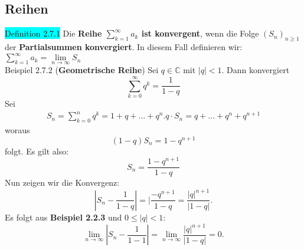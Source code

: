 \documentclass[landscape, 10pt]{article}
\newcommand{\C}{\mathbb{C}}
\begin{document}
\begin{multicols}{3}
       \subsection{Reihen}
              \colorbox{cyan}{Definition 2.7.1} 
                     Die \textbf{Reihe 
                     $\sum_{k=1}^\infty a_k$ ist konvergent}, 
                     wenn die Folge 
                     \textcolor{NavyBlue}{$(S_n)_{n\geqslant1}$} 
                     der \textbf{Partialsummen konvergiert}. In 
                     diesem Fall definieren wir: 
                     \textcolor{NavyBlue}{
                     $\sum_{k=1}^\infty a_k
                     =\lim\limits_{n\to\infty}S_n$}\\
              \colorbox{Dandelion}{Beispiel 2.7.2} 
              (\textbf{Geometrische Reihe}) 
                     Sei $q\in\C$ mit 
                     $|q|<1$. Dann konvergiert
                     \begin{equation*}
                            \sum_{k=0}^\infty q^k=\frac{1}{1-q}
                     \end{equation*}
                     Sei 
                     \begin{align*}
                            S_n=\sum_{k=0}^n q^k=1+q+...+q^n.
                            q\cdot S_n=q+...+q^n+q^{n+1}
                     \end{align*}
                     woraus
                     \begin{equation*}
                            (1-q)S_n=1-q^{n+1}
                     \end{equation*}
                     folgt. Es gilt also: 
                     \begin{equation*}
                            S_n=\frac{1-q^{n+1}}{1-q}
                     \end{equation*}
                     Nun zeigen wir die Konvergenz: 
                     \begin{equation*}
                            |S_n-\frac{1}{1-q}|
                            =|\frac{-q^{n+1}}{1-q}
                            =\frac{|q|^{n+1}}{|1-q|}.
                     \end{equation*}
                     Es folgt aus
                     \textbf{Beispiel 2.2.3} 
                     und $0\leqslant|q|<1$:
                     \begin{equation*}
                            \lim\limits_{n\to\infty}|S_n-\frac{1}{1-1}|
                            =\lim\limits_{n\to\infty}\frac{|q|^{n+1}}{|1-q|}=0.

\end{equation*}
\end{multicols}
\end{document}
